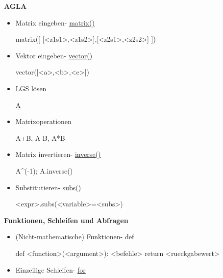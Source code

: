 \documentclass[a4paper,9pt,DIV15,twocolumn]{scrartcl}
\begin{document}
\textbf{AGLA}
\begin{itemize}
\item Matrix eingeben- \href{https://sage.math.uni-goettingen.de/doc/static/reference/sage/matrix/constructor.html#sage.matrix.constructor.Matrix}{matrix()}
\begin{sagein}
matrix([ [<z1s1>,<z1s2>],[<z2s1>,<z2s2>] ])
\end{sagein}
 \item Vektor eingeben- \href{https://sage.math.uni-goettingen.de/doc/static/reference/sage/modules/free_module_element.html#sage.modules.free_module_element.vector}{vector()}
\begin{sagein}
vector([<a>,<b>,<c>])
\end{sagein}
\item LGS lösen 
\begin{sagein}
A\b
\end{sagein}
\item Matrixoperationen 
\begin{sagein}
A+B, A-B, A*B
\end{sagein}
\item Matrix invertieren- \href{https://sage.math.uni-goettingen.de/doc/static/reference/sage/matrix/matrix2.html?highlight=matrix.inverse#sage.matrix.matrix2.Matrix.inverse}{inverse()}
\begin{sagein}
A^(-1); A.inverse()
\end{sagein}
\item Substitutieren- \href{https://sage.math.uni-goettingen.de/doc/static/reference/sage/crypto/mq/mpolynomialsystem.html#sage.crypto.mq.mpolynomialsystem.MPolynomialRoundSystem_generic.subs}{subs()}
\begin{sagein}
<expr>.subs(<variable>=<subs>)
\end{sagein}
\end{itemize}

\textbf{Funktionen, Schleifen und Abfragen}
\begin{itemize}
    \item (Nicht-mathematische) Funktionen- \href{http://docs.python.org/reference/compound_stmts.html#function-definitions}{def}
\begin{sagein}
def <function>(<argument>): <befehle> return <rueckgabewert>
\end{sagein}
    \item Einzeilige Schleifen- \href{http://docs.python.org/tutorial/controlflow.html#for-statements}{for}
\begin{sagein}
\end{sagein}
\end{itemize}
\end{document}
